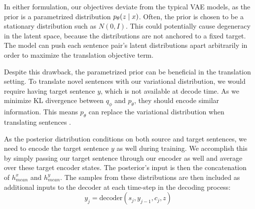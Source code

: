 

In either formulation, our objectives deviate from the typical VAE models, as the prior is a parametrized distribution $p_{\theta}(z \; | \;{x})$. Often, the prior is chosen to be a stationary distribution such as $N(0, I)$. This could potentially cause degeneracy in the latent space, because the distributions are not anchored to a fixed target. The model can push each sentence pair's latent distributions apart arbitrarily in order to maximize the translation objective term. %

Despite this drawback, the parametrized prior can be beneficial in the translation setting. To translate novel sentences with our variational distribution, we would require having target sentence $y$, which is not available at decode time. As we minimize KL divergence between $q_{\phi}$ and $p_{\theta}$, they should encode similar information. This means $p_{\theta}$ can replace the variational distribution when translating sentences \cite{Zhang2016VNMT}. %

As the  posterior distribution conditions on both source and target sentences, we need to encode the target sentence $y$ as well during training. We accomplish this by simply passing our target sentence through our encoder as well and average over these target encoder states. The posterior's input is then the concatenation of $h_{mean}^{x}$ and $h_{mean}^{y}$. The samples from these distributions are then included as additional inputs to the decoder at each time-step in the decoding process:
\begin{equation}
y_{j} = \text{decoder}(s_{j}, y_{j-1}, c_{j}, z)
\end{equation}



